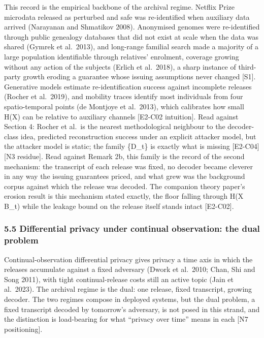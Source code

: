 \documentclass[
  11pt,
]{article}
\begin{document}
This record is the empirical backbone of the archival regime. Netflix
Prize microdata released as perturbed and safe was re-identified when
auxiliary data arrived (Narayanan and Shmatikov 2008). Anonymised
genomes were re-identified through public genealogy databases that did
not exist at scale when the data was shared (Gymrek et al.~2013), and
long-range familial search made a majority of a large population
identifiable through relatives' enrolment, coverage growing without any
action of the subjects (Erlich et al.~2018), a sharp instance of
third-party growth eroding a guarantee whose issuing assumptions never
changed {[}S1{]}. Generative models estimate re-identification success
against incomplete releases (Rocher et al.~2019), and mobility traces
identify most individuals from four spatio-temporal points (de Montjoye
et al.~2013), which calibrates how small H(X) can be relative to
auxiliary channels {[}E2-C02 intuition{]}. Read against Section 4:
Rocher et al.~is the nearest methodological neighbour to the
decoder-class idea, predicted reconstruction success under an explicit
attacker model, but the attacker model is static; the family \{D\_t\} is
exactly what is missing {[}E2-C04{]}{[}N3 residue{]}. Read against
Remark 2b, this family is the record of the second mechanism: the
transcript of each release was fixed, no decoder became cleverer in any
way the issuing guarantees priced, and what grew was the background
corpus against which the release was decoded. The companion theory
paper's erosion result is this mechanism stated exactly, the floor
falling through H(X \textbar{} B\_t) while the leakage bound on the
release itself stands intact {[}E2-C02{]}.

\subsubsection{5.5 Differential privacy under continual observation: the
dual
problem}\label{differential-privacy-under-continual-observation-the-dual-problem}

Continual-observation differential privacy gives privacy a time axis in
which the releases accumulate against a fixed adversary (Dwork et
al.~2010; Chan, Shi and Song 2011), with tight continual-release costs
still an active topic (Jain et al.~2023). The archival regime is the
dual: one release, fixed transcript, growing decoder. The two regimes
compose in deployed systems, but the dual problem, a fixed transcript
decoded by tomorrow's adversary, is not posed in this strand, and the
distinction is load-bearing for what ``privacy over time'' means in each
{[}N7 positioning{]}.
\end{document}
